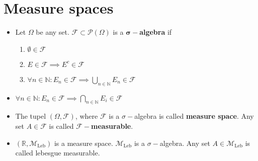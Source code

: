 \documentclass[a4paper, 11pt]{article}
\theoremstyle{plain}
\theoremstyle{definition}
\begin{document}
\section{Measure spaces}
\begin{itemize}
	\item Let $\Omega$ be any set. $\mathcal F \subset \mathcal P(\Omega)$ is a \textbf{$\mathbf{\sigma-}$algebra} if
	\begin{enumerate}[label=(\arabic*)]
		\item $\emptyset \in \mathcal F$ 
		\item $E \in \mathcal F \implies E^c \in \mathcal F$ 
		\item $\forall n \in \mathbb N: E_n \in \mathcal F \implies \bigcup_{n \in \mathbb N} E_n \in \mathcal F$
	\end{enumerate}
	\item $\forall n \in \mathbb N: E_n \in \mathcal F \implies \bigcap_{n \in \mathbb N} E_i \in \mathcal F$
	\item The tupel $(\Omega, \mathcal F)$, where $\mathcal F$ is a $\sigma-$algebra is called \textbf{measure space}. Any set $A \in \mathcal F$ is called $\mathbf{\mathcal F}-$\textbf{measurable}.
	\item $(\mathbb R, \mathcal M_{\mathrm{Leb}})$ is a measure space. $ \mathcal M_{\mathrm{Leb}}$ is a $\sigma-$algebra. Any set $A \in  \mathcal M_{\mathrm{Leb}}$ is called lebesgue measurable.
\end{itemize}
\end{document}
